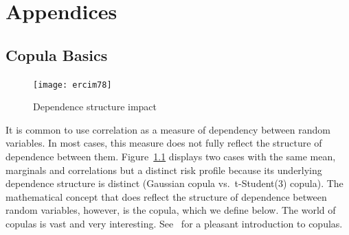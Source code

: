 \documentclass[11pt,fleqn]{book} %
\begin{document}

\appendix
{}
\chapter{Appendices}

\section{Copula Basics}
\label{ap:copula_basics}

\begin{figure}
	\vspace{-25pt}
	\begin{center}
		\texttt{[image: ercim78]}
	\end{center}
	\vspace{-10pt}
	\caption{Dependence structure impact}
	\vspace{-10pt}
	\label{fig:copula_impact}
\end{figure}
It is common to use correlation as a measure of dependency between random 
variables. In most cases, this measure does not fully reflect the structure 
of dependence between them. Figure~\ref{fig:copula_impact} displays two
cases with the same mean, marginals and correlations but a distinct risk
profile because its underlying  dependence structure is distinct (Gaussian 
copula vs.\ t-Student(3) copula). The mathematical concept that does reflect 
the structure of dependence between random variables, however, is the copula, 
which we define below. The world of copulas is vast and very interesting. 
See~\cite[chap. 5]{mcneil:2005} for a pleasant introduction to copulas.
\end{document}
